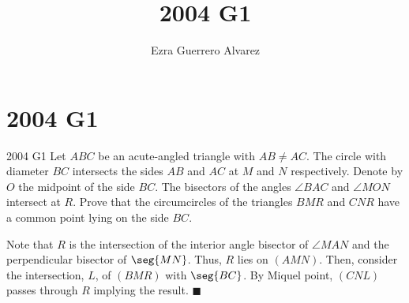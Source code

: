 \documentclass[14pt]{article}
\title{2004 G1}
\author{Ezra Guerrero Alvarez}
\begin{document}
\maketitle
	
\section*{2004 G1}

\begin{statement}{2004 G1}
	Let $ABC$ be an acute-angled triangle with $AB\neq AC$. The circle with diameter $BC$ intersects the sides $AB$ and $AC$ at $M$ and $N$ respectively. Denote by $O$ the midpoint of the side $BC$. The bisectors of the angles $\angle BAC$ and $\angle MON$ intersect at $R$. Prove that the circumcircles of the triangles $BMR$ and $CNR$ have a common point lying on the side $BC$.
\end{statement}
Note that $R$ is the intersection of the interior angle bisector of $\angle MAN$ and the perpendicular bisector of $\seg{MN}$. Thus, $R$ lies on $(AMN)$. Then, consider the intersection, $L$, of $(BMR)$ with $\seg{BC}$. By Miquel point, $(CNL)$ passes through $R$ implying the result. $\blacksquare$
	
\end{document}
